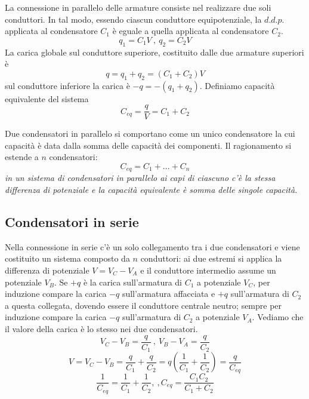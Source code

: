 \documentclass[class=book, crop=false, oneside, 12pt]{standalone}
\begin{document}
La connessione in parallelo delle armature consiste nel realizzare due soli conduttori. 
In tal modo, essendo ciascun conduttore equipotenziale, la \(d.d.p.\) applicata al condensatore \(C_1\) è eguale a quella applicata al condensatore \(C_2\).
\begin{equation*}
    q_1 = C_1 V \ , \ q_2 = C_2 V
\end{equation*}
La carica globale sul conduttore superiore, costituito dalle due armature superiori è
\begin{equation*}
    q = q_1 + q_2 = \left(C_1 + C_2 \right)V
\end{equation*}
sul conduttore inferiore la carica è \(-q = -( q_1 + q_2)\). Definiamo capacità equivalente del sistema
\begin{equation}
    C_{eq} = \frac{q}{V} = C_1 + C_2
\end{equation} 

Due condensatori in parallelo si comportano come un unico condensatore la cui capacità è data dalla somma delle capacità dei componenti. 
Il ragionamento si estende a \(n\) condensatori:
\begin{equation*}
    C_{eq} = C_1 + ... + C_n
\end{equation*}
\emph{in un sistema di condensatori in parallelo ai capi di ciascuno c'è la stessa differenza di potenziale e la capacità equivalente è somma delle singole capacità}.

\subsection{Condensatori in serie}
Nella connessione in serie c'è un solo collegamento tra i due condensatori e viene costituito un sistema composto da \(n\) conduttori: ai due estremi si applica la differenza di potenziale \(V = V_C-V_A\) e il conduttore intermedio assume un potenziale \(V_B\).
Se \(+q\) è la carica sull'armatura di \(C_1\) a potenziale \(V_C\), per induzione compare la carica \(-q\) sull'armatura affacciata e \(+q\) sull'armatura di \(C_2\) a questa collegata, dovendo essere il conduttore centrale neutro; sempre per induzione compare la carica \(-q\) sull'armatura di \(C_2\) a potenziale \(V_A\). 
Vediamo che il valore della carica è lo stesso nei due condensatori. 
\begin{equation*}
    V_C -V_B = \frac{q}{C_1} \ , \ V_B - V_A = \frac{q}{C_2}
\end{equation*}
\begin{equation*}
    V = V_C -V_B = \frac{q}{C_1} + \frac{q}{C_2} = q \left(\frac{1}{C_1} + \frac{1}{C_2}\right) = \frac{q}{C_{eq}}
\end{equation*}
\begin{equation*}
    \frac{1}{C_{eq}} = \frac{1}{C_1} + \frac{1}{C_2} , \ , C_{eq} = \frac{C_1 C_2}{C_1 + C_2}
\end{equation*}
\end{document}
